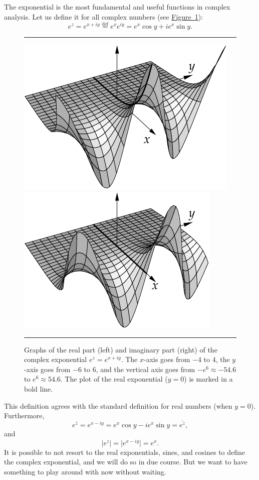 \documentclass[12pt,openany]{book}
\newcommand{\sabs}[1]{\lvert {#1} \rvert}
\theoremstyle{plain}
\theoremstyle{remark}
\theoremstyle{definition}
\newenvironment{myfig}{%
\begin{figure}[h!t]
\noindent\rule{\textwidth}{0.4pt}\vspace{12pt}\par\centering}%
{\par\noindent\rule{\textwidth}{0.4pt}
\end{figure}}
\theoremstyle{exercise}
\theoremstyle{example}
\newcommand{\figureref}[1]{\hyperref[#1]{Figure~\ref*{#1}}}
\begin{document}
The exponential is the most fundamental and useful functions in complex
analysis.  Let us define it for all complex numbers (see
\figureref{fig:complexexpgraphs}):
\begin{equation*}
e^{z} = 
e^{x+iy}
\overset{\text{def}}{=}
e^x e^{iy}
=
e^x\cos y + i e^x \sin y .
\end{equation*}
\begin{myfig}
\includegraphics{figures/realexp}
\qquad
\includegraphics{figures/imagexp}
\caption{Graphs of the real part (left) and imaginary part (right)
of the complex exponential $e^z = e^{x+iy}$.  The $x$-axis goes from $-4$ to
$4$, the $y$-axis goes from $-6$ to $6$, and the vertical axis goes from
$-e^{6} \approx -54.6$
to
$e^{6} \approx 54.6$.  The plot of the real exponential ($y=0$)
is marked in a bold line.\label{fig:complexexpgraphs}}
\end{myfig}

This definition agrees with the standard definition for real numbers (when
$y=0$).  Furthermore,
\begin{equation*}
e^{\bar{z}} = 
e^{x-iy} =
e^x\cos y - i e^x \sin y  = \overline{e^{z}} ,
\end{equation*}
and
\begin{equation*}
\sabs{e^{z}} = 
\sabs{e^{x-iy}} =
e^x .
\end{equation*}
It is possible to not resort to the real exponentials, sines, and cosines
to define the complex exponential, and we will do so in due course.
But we want to have something to play around with now without waiting.
\end{document}
